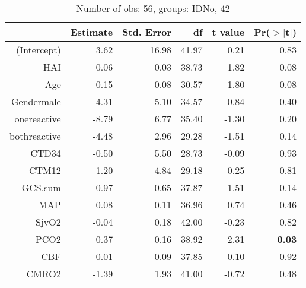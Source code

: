 \documentclass{article}
\begin{document}
\begin{table}[H]
\centering
\begin{tabular}{rrrrrr}
  \hline
 & Estimate & Std. Error & df & t value & Pr($>$$|$t$|$) \\ 
  \hline
(Intercept) & 3.62 & 16.98 & 41.97 & 0.21 & 0.83 \\ 
  HAI & 0.06 & 0.03 & 38.73 & 1.82 & 0.08 \\ 
  Age & -0.15 & 0.08 & 30.57 & -1.80 & 0.08 \\ 
  Gendermale & 4.31 & 5.10 & 34.57 & 0.84 & 0.40 \\ 
  onereactive & -8.79 & 6.77 & 35.40 & -1.30 & 0.20 \\ 
  bothreactive & -4.48 & 2.96 & 29.28 & -1.51 & 0.14 \\ 
  CTD34 & -0.50 & 5.50 & 28.73 & -0.09 & 0.93 \\ 
  CTM12 & 1.20 & 4.84 & 29.18 & 0.25 & 0.81 \\ 
  GCS.sum & -0.97 & 0.65 & 37.87 & -1.51 & 0.14 \\ 
  MAP & 0.08 & 0.11 & 36.96 & 0.74 & 0.46 \\ 
  SjvO2 & -0.04 & 0.18 & 42.00 & -0.23 & 0.82 \\ 
  PCO2 & 0.37 & 0.16 & 38.92 & 2.31 & {\bf 0.03} \\ 
  CBF & 0.01 & 0.09 & 37.85 & 0.10 & 0.92 \\ 
  CMRO2 & -1.39 & 1.93 & 41.00 & -0.72 & 0.48 \\ 
   \hline
\end{tabular}
\caption{Number of obs: 56, groups: IDNo, 42}
\label{tab: lmm3}
\end{table}
\end{document}
